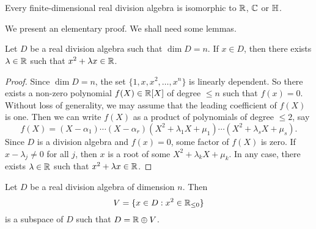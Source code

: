 \chapter{}


\begin{theorem}[Frobenius]
	\label{thm:Frobenius}
	Every finite-dimensional real division algebra is isomorphic to $\mathbb{R}$, $\mathbb{C}$
	or $\mathbb{H}$.
\end{theorem}

We present an elementary proof. We shall need some lemmas. 

\begin{lemma}
	\label{lem:trick_frobenius1}
	Let $D$ be a real division algebra such that $\dim D=n$. If $x\in D$, then
	there exists $\lambda\in\mathbb{R}$ such that $x^2+\lambda x\in\mathbb{R}$.
\end{lemma}

\begin{proof}
	Since $\dim D=n$, the set $\{1,x,x^2,\dots,x^n\}$ is linearly dependent. So
	there exists a non-zero polynomial $f(X)\in\mathbb{R}[X]$ of degree $\leq n$ such
	that $f(x)=0$. Without loss of generality, we may assume that the leading
	coefficient of $f(X)$ is one. Then we can write $f(X)$ as a product of
	polynomials of degree $\leq2$, say 
	\[
		f(X)=(X-\alpha_1)\cdots (X-\alpha_r)(X^2+\lambda_1 X+\mu_1)\cdots (X^2+\lambda_s X+\mu_s).
	\]
	Since $D$ is a division algebra and $f(x)=0$, some factor of $f(X)$ is
	zero. If $x-\lambda_j\ne 0$ for all $j$, then $x$ is a root of some
	$X^2+\lambda_k X+\mu_k$. In any case, there exists $\lambda\in\mathbb{R}$ such that
	$x^2+\lambda x\in\mathbb{R}$. 
\end{proof}

\begin{lemma}
	\label{lem:trick_frobenius2}
	Let $D$ be a real division algebra of dimension $n$. Then
	\[
		V=\{x\in D:x^2\in\mathbb{R}_{\leq0}\}
	\]
	is a subspace of $D$ such that $D=\mathbb{R}\oplus V$.
\end{lemma}

